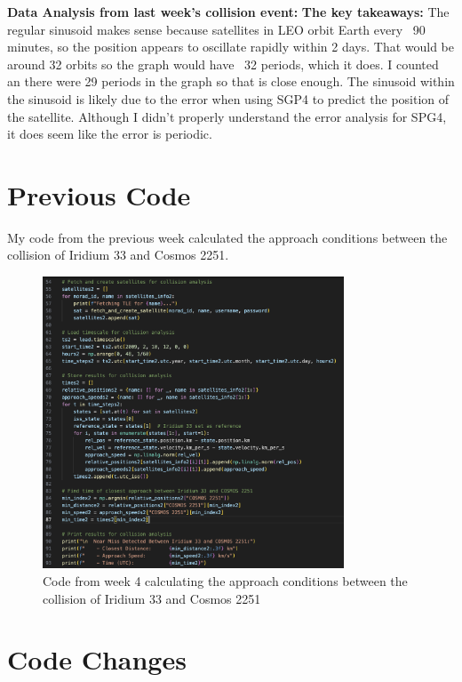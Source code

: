 \documentclass[12pt]{report}
\begin{document}
\textbf{Data Analysis from last week's collision event:}
\newline
\textbf{The key takeaways:}
The regular sinusoid makes sense because satellites in LEO orbit Earth every ~90 minutes, so the position appears to oscillate rapidly within 2 days. That would be around 32 orbits so the graph would have ~32 periods, which it does. I counted an there were 29 periods in the graph so that is close enough.
The sinusoid within the sinusoid is likely due to the error when using SGP4 to predict the position of the satellite. Although I didn't properly understand the error analysis for SPG4, it does seem like the error is periodic.

\chapter*{Previous Code}
My code from the previous week calculated the approach conditions between the collision of Iridium 33 and Cosmos 2251.

\begin{figure}[H]
    \centering
    \includegraphics[width=0.8\textwidth]{figure_week_4_code.png}
    \caption{Code from week 4 calculating the approach conditions between the collision of Iridium 33 and Cosmos 2251}
    \label{fig:code}
\end{figure}

\chapter*{Code Changes}
\end{document}
